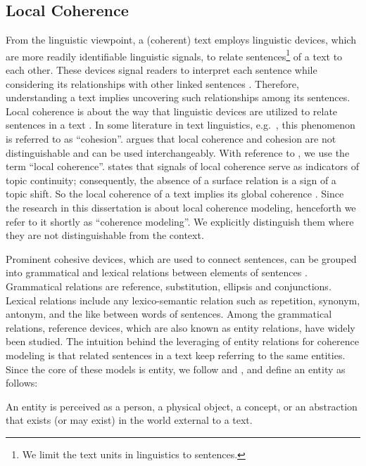 \subsection{Local Coherence}

From the linguistic viewpoint, a (coherent) text employs linguistic devices, which are more readily identifiable linguistic signals, to relate sentences\footnote{We limit the text units in linguistics to sentences.} of a text to each other. 
These devices signal readers to interpret each sentence while considering its relationships with other linked sentences \cite{vandijk77}. 
Therefore, understanding a text implies uncovering such relationships among its sentences. 
Local coherence is about the way that linguistic devices are utilized to relate sentences in a text \cite{stede12}.  
In some literature in text linguistics, e.g.\ , this phenomenon is referred to as ``cohesion''.    
 argues that local coherence and cohesion are not distinguishable and can be used interchangeably. 
With reference to , we use the term ``local coherence''. 
 states that signals of local coherence serve as indicators of topic continuity; consequently, the absence of a surface relation is a sign of a topic shift. 
So the local coherence of a text implies its global coherence \cite{barzilay08}.   
Since the research in this dissertation is about local coherence modeling, henceforth we refer to it shortly as ``coherence modeling''.  
We explicitly distinguish them where they are not distinguishable from the context. 

Prominent cohesive devices, which are used to connect sentences, can be grouped into grammatical and lexical relations between elements of sentences \cite{halliday76}. 
Grammatical relations are reference, substitution, ellipsis and conjunctions. 
Lexical relations include any lexico-semantic relation such as repetition, synonym, antonym, and the like between words of sentences. 
Among the grammatical relations, reference devices, which are also known as entity relations, have widely been studied.  
The intuition behind the leveraging of entity relations for coherence modeling is that related sentences in a text keep referring to the same entities. 
Since the core of these models is entity, we follow  and , and define an entity as follows: 

\begin{definition}
    An entity is perceived as a person, a physical object, a concept, or an abstraction that exists (or may exist) in the world external to a text.  
\end{definition}

